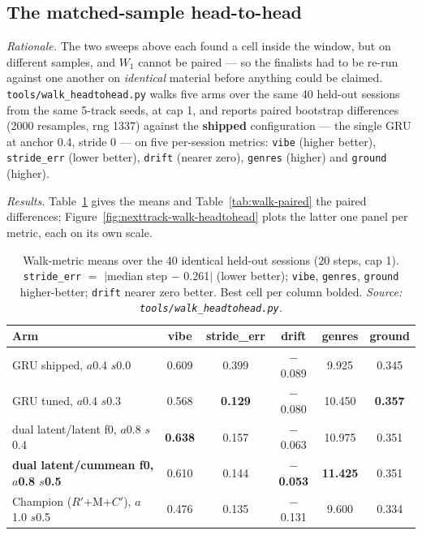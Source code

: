 \documentclass[11pt]{article}
\newcommand{\best}[1]{\textbf{#1}}
\newcommand{\Rp}{\ensuremath{R'}}
\newcommand{\Cp}{\ensuremath{C'}}
\begin{document}
\subsection{The matched-sample head-to-head}
\label{sec:walk-h2h}
\emph{Rationale.} The two sweeps above each found a cell inside the window, but
on different samples, and $W_1$ cannot be paired --- so the finalists had to be
re-run against one another on \emph{identical} material before anything could be
claimed. \texttt{tools/walk\_headtohead.py} walks five arms over the same
\num{40} held-out sessions from the same 5-track seeds, at cap 1, and reports
paired bootstrap differences (\num{2000} resamples, rng \num{1337}) against the
\textbf{shipped} configuration --- the single GRU at anchor \num{0.4}, stride
\num{0} --- on five per-session metrics: \texttt{vibe} (higher better),
\texttt{stride\_err} (lower better), \texttt{drift} (nearer zero),
\texttt{genres} (higher) and \texttt{ground} (higher).

\emph{Results.} Table~\ref{tab:walk-means} gives the means and
Table~\ref{tab:walk-paired} the paired differences;
Figure~\ref{fig:nexttrack-walk-headtohead} plots the latter one panel per
metric, each on its own scale.

\begin{table}[ht]
  \centering
  \caption{Walk-metric means over the \num{40} identical held-out sessions
  ($\num{20}$ steps, cap 1). \texttt{stride\_err} $=$
  $|$median step $-$ \num{0.261}$|$ (lower better); \texttt{vibe},
  \texttt{genres}, \texttt{ground} higher-better; \texttt{drift} nearer zero
  better. Best cell per column bolded.
  \emph{Source: \texttt{tools/walk\_headtohead.py}.}}
  \label{tab:walk-means}
  {\footnotesize\setlength{\tabcolsep}{6pt}\begin{tabular}{lccccc}
    \toprule
    Arm & vibe & stride\_err & drift & genres & ground \\
    \midrule
    GRU shipped, $a$\num{0.4} $s$\num{0.0} & 0.609 & 0.399 & $-$0.089 & 9.925 & 0.345 \\
    GRU tuned, $a$\num{0.4} $s$\num{0.3} & 0.568 & \best{0.129} & $-$0.080 & 10.450 & \best{0.357} \\
    dual latent/latent f0, $a$\num{0.8} $s$\num{0.4} & \best{0.638} & 0.157 & $-$0.063 & 10.975 & 0.351 \\
    \best{dual latent/cummean f0, $a$\num{0.8} $s$\num{0.5}} & 0.610 & 0.144 & \best{$-$0.053} & \best{11.425} & 0.351 \\
    Champion (\Rp+M+\Cp), $a$\num{1.0} $s$\num{0.5} & 0.476 & 0.135 & $-$0.131 & 9.600 & 0.334 \\
    \bottomrule
  \end{tabular}}
\end{table}
\end{document}
